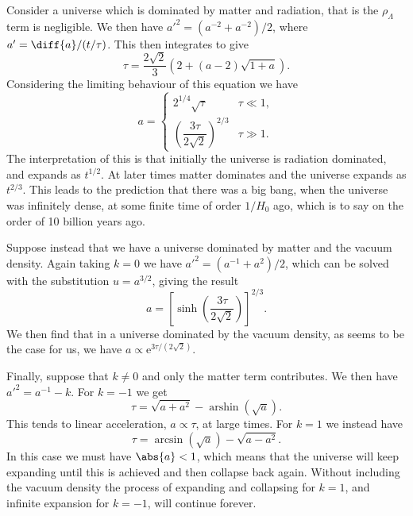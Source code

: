 \documentclass[fleqn]{NotesClass}
\newcommand*{\e}{\mathrm{e}}
\DeclareMathOperator{\arsinh}{arshin}
\begin{document}
    Consider a universe which is dominated by matter and radiation, that is the \(\rho_{\Lambda}\) term is negligible.
    We then have \(a'^2 = (a^{-2} + a^{-2})/2\), where \(a' = \diff{a}/{(t/\tau)}\).
    This then integrates to give
    \begin{equation}
        \tau = \frac{2\sqrt{2}}{3}(2 + (a - 2)\sqrt{1 + a}).
    \end{equation}
    Considering the limiting behaviour of this equation we have
    \begin{equation}
        a =
        \begin{cases}
            2^{1/4}\sqrt{\tau} & \tau \ll 1,\\
            \left( \dfrac{3\tau}{2\sqrt{2}} \right)^{2/3} & \tau \gg 1.
        \end{cases}
    \end{equation}
    The interpretation of this is that initially the universe is radiation dominated, and expands as \(t^{1/2}\).
    At later times matter dominates and the universe expands as \(t^{2/3}\).
    This leads to the prediction that there was a big bang, when the universe was infinitely dense, at some finite time of order \(1/H_0\) ago, which is to say on the order of 10 billion years ago.
    
    Suppose instead that we have a universe dominated by matter and the vacuum density.
    Again taking \(k = 0\) we have \(a'^2 = (a^{-1} + a^2)/2\), which can be solved with the substitution \(u = a^{3/2}\), giving the result
    \begin{equation}
        a = \left[ \sinh\left( \frac{3\tau}{2\sqrt{2}} \right) \right]^{2/3}.
    \end{equation}
    We then find that in a universe dominated by the vacuum density, as seems to be the case for us, we have \(a \propto \e^{3\tau/(2\sqrt{2})}\).
    
    Finally, suppose that \(k \ne 0\) and only the matter term contributes.
    We then have \(a'^2 = a^{-1} - k\).
    For \(k = -1\) we get
    \begin{equation}
        \tau = \sqrt{a + a^2} - \arsinh(\sqrt{a}).
    \end{equation}
    This tends to linear acceleration, \(a \propto \tau\), at large times.
    For \(k = 1\) we instead have
    \begin{equation}
        \tau = \arcsin(\sqrt{a}) - \sqrt{a - a^2}.
    \end{equation}
    In this case we must have \(\abs{a} < 1\), which means that the universe will keep expanding until this is achieved and then collapse back again.
    Without including the vacuum density the process of expanding and collapsing for \(k = 1\), and infinite expansion for \(k = -1\), will continue forever.
    
\end{document}
